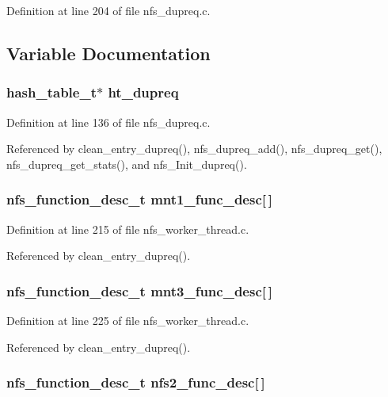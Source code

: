 Definition at line 204 of file nfs\_\-dupreq.c.

\subsection{Variable Documentation}
\subsubsection{\setlength{\rightskip}{0pt plus 5cm}hash\_\-table\_\-t$\ast$ {\bf ht\_\-dupreq}}\label{nfs__dupreq_8c_a6}




Definition at line 136 of file nfs\_\-dupreq.c.

Referenced by clean\_\-entry\_\-dupreq(), nfs\_\-dupreq\_\-add(), nfs\_\-dupreq\_\-get(), nfs\_\-dupreq\_\-get\_\-stats(), and nfs\_\-Init\_\-dupreq().
\subsubsection{\setlength{\rightskip}{0pt plus 5cm}nfs\_\-function\_\-desc\_\-t {\bf mnt1\_\-func\_\-desc}[$\,$]}\label{nfs__dupreq_8c_a4}




Definition at line 215 of file nfs\_\-worker\_\-thread.c.

Referenced by clean\_\-entry\_\-dupreq().
\subsubsection{\setlength{\rightskip}{0pt plus 5cm}nfs\_\-function\_\-desc\_\-t {\bf mnt3\_\-func\_\-desc}[$\,$]}\label{nfs__dupreq_8c_a5}




Definition at line 225 of file nfs\_\-worker\_\-thread.c.

Referenced by clean\_\-entry\_\-dupreq().
\subsubsection{\setlength{\rightskip}{0pt plus 5cm}nfs\_\-function\_\-desc\_\-t {\bf nfs2\_\-func\_\-desc}[$\,$]}\label{nfs__dupreq_8c_a1}




